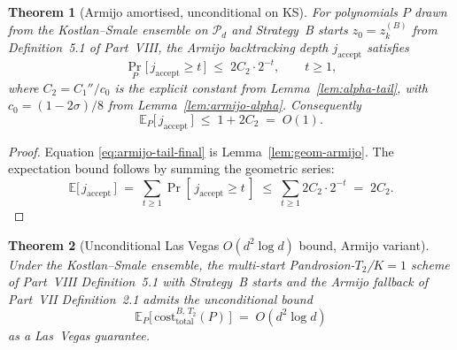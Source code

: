 \documentclass[11pt,a4paper]{article}
\newtheorem{theorem}{Theorem}[section]
\begin{document}
\begin{theorem}[Armijo amortised, unconditional on KS]\label{thm:armijo-tail-unconditional}
For polynomials $P$ drawn from the Kostlan--Smale ensemble on $\mathcal{P}_d$ and Strategy~B starts $z_0 = z_k^{(B)}$ from Definition~5.1 of Part~VIII, the Armijo backtracking depth $j_{\text{accept}}$ satisfies
\begin{equation}\label{eq:armijo-tail-final}
\Pr_{P}\bigl[\,j_{\text{accept}} \ge t\,\bigr] \;\le\; 2 C_2 \cdot 2^{-t}, \qquad t \ge 1,
\end{equation}
where $C_2 = C_1'' / c_0$ is the explicit constant from Lemma~\ref{lem:alpha-tail}, with $c_0 = (1 - 2\sigma)/8$ from Lemma~\ref{lem:armijo-alpha}. Consequently
\begin{equation}\label{eq:E-jaccept}
\mathbb{E}_{P}\!\bigl[\,j_{\text{accept}}\,\bigr] \;\le\; 1 + 2 C_2 \;=\; O(1).
\end{equation}
\end{theorem}

\begin{proof}
Equation \eqref{eq:armijo-tail-final} is Lemma~\ref{lem:geom-armijo}. The expectation bound follows by summing the geometric series:
$$
\mathbb{E}\bigl[\,j_{\text{accept}}\,\bigr] \;=\; \sum_{t \ge 1}\Pr[\,j_{\text{accept}} \ge t\,] \;\le\; \sum_{t \ge 1} 2C_2 \cdot 2^{-t} \;=\; 2 C_2.
$$
\end{proof}

\begin{theorem}[Unconditional Las Vegas $O(d^{2}\log d)$ bound, Armijo variant]\label{thm:lasvegas-uncond}
Under the Kostlan--Smale ensemble, the multi-start Pandrosion-$T_2$/$K{=}1$ scheme of Part~VIII Definition~5.1 with Strategy~B starts and the Armijo fallback of Part~VII Definition~2.1 admits the unconditional bound
\begin{equation}\label{eq:final-uncond}
\mathbb{E}_{P}\!\bigl[\,\mathrm{cost}^{B,\, T_2}_{\text{total}}(P)\,\bigr] \;=\; O(d^{2}\log d)
\end{equation}
as a Las~Vegas guarantee.
\end{theorem}
\end{document}
